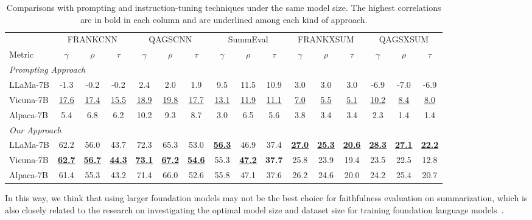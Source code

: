 \begin{table}[t]
	\scriptsize
	\centering
	\begin{tabular}{l|ccc|ccc|ccc|ccc|ccc}
		\toprule[1pt]
		&  \multicolumn{3}{c}{FRANKCNN} & \multicolumn{3}{c}{QAGSCNN} & \multicolumn{3}{c}{SummEval} & \multicolumn{3}{c}{FRANKXSUM} & \multicolumn{3}{c}{QAGSXSUM} \\
		Metric & $\gamma$ &$\rho$ & $\tau$ & $\gamma$ &$\rho$ & $\tau$ & $\gamma$ &$\rho$ & $\tau$ & $\gamma$ &$\rho$ & $\tau$ & $\gamma$ &$\rho$ & $\tau$ \\
		\hline
		\multicolumn{5}{l}{\textit{Prompting Approach}} \\
		LLaMa-7B & -1.3 & -0.2 & -0.2 & 2.4 & 2.0 & 1.9  & 9.5 & 11.5 & 10.9 & 3.0 & 3.0 & 3.0  & -6.9 & -7.0 & -6.9 \\
		Vicuna-7B &\underline{17.6} & \underline{17.4} & \underline{15.5} & \underline{18.9} & \underline{19.8} & \underline{17.7} &\underline{13.1} & \underline{11.9} & \underline{11.1} & \underline{7.0} & \underline{5.5} & \underline{5.1} & \underline{10.2} & \underline{8.4} & \underline{8.0} \\
		Alpaca-7B &5.4 & 6.8 & 6.2 & 10.2 & 9.3 & 8.7 & 3.0 & 6.5 & 5.6 & 3.8 & 3.4 & 3.4 & 2.3 & 1.4 & 1.4 \\
		\hline
		\multicolumn{5}{l}{\textit{Our Approach}} \\
		LLaMa-7B & 62.2 & 56.0 & 43.7 & 72.3 & 65.3 & 53.0 & \underline{\textbf{56.3}} & 46.9 & 37.4 & \underline{\textbf{27.0}} & \underline{\textbf{25.3}} & \underline{\textbf{20.6}} & \underline{\textbf{28.3}} & \underline{\textbf{27.1}} & \underline{\textbf{22.2}}  \\
		Vicuna-7B & \underline{\textbf{62.7}} & \underline{\textbf{56.7}} & \underline{\textbf{44.3}} & \underline{\textbf{73.1}} & \underline{\textbf{67.2}} & \underline{\textbf{54.6}} & 55.3 & \underline{\textbf{47.2}} & \textbf{37.7} & 25.8 & 23.9 & 19.4 & 23.5 & 22.5 & 12.8\\
		Alpaca-7B & 61.4 & 55.3 & 43.2 & 71.4 & 66.0 & 52.6 & 55.8 & 47.1 & 37.6 & 26.2 & 24.6 & 20.0 & 24.2 & 25.4 & 20.7\\
		\bottomrule[1pt]
	\end{tabular}
	\caption{Comparisons with prompting and instruction-tuning techniques under the same model size. The highest correlations are in bold in each column and are underlined among each kind of approach.} 
	\label{tab:prompt}
\end{table}


In this way, we think that using larger foundation models may not be the best choice for faithfulness evaluation on summarization, which is also closely related to the research on investigating the optimal model size and dataset size for training foundation language models~\cite{hoffmann2022empirical}. 



